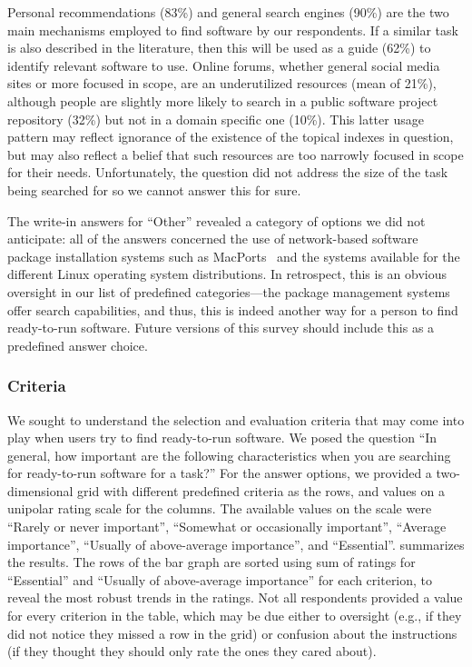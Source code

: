 \documentclass{casicswhitepaper}
\begin{document}
Personal recommendations (83\%) and general search engines (90\%) are the two main mechanisms employed to find software by our respondents. If a similar task is also described in the literature, then this will be used as a guide (62\%) to identify relevant software to use. Online forums, whether general social media sites or more focused in scope, are an underutilized resources (mean of 21\%), although people are slightly more likely to search in a public software project repository (32\%) but not in a domain specific one (10\%). This latter usage pattern may reflect ignorance of the existence of the topical indexes in question, but may also reflect a belief that such resources are too narrowly focused in scope for their needs. Unfortunately, the question did not address the size of the task being searched for so we cannot answer this for sure.

The write-in answers for ``Other'' revealed a category of options we did not anticipate: all of the answers concerned the use of network-based software package installation systems such as MacPorts~\cite{fuller2002macports} and the systems available for the different Linux operating system distributions.  In retrospect, this is an obvious oversight in our list of predefined categories---the package management systems offer search capabilities, and thus, this is indeed another way for a person to find ready-to-run software.  Future versions of this survey should include this as a predefined answer choice.


\subsubsection{Criteria}
\label{criteria-ready-to-use}

We sought to understand the selection and evaluation criteria that may come into play when users try to find ready-to-run software.  We posed the question ``In general, how important are the following characteristics when you are searching for ready-to-run software for a task?''  For the answer options, we provided a two-dimensional grid with different predefined criteria as the rows, and values on a unipolar rating scale for the columns.  The available values on the scale were ``Rarely or never important'', ``Somewhat or occasionally important'', ``Average importance'', ``Usually of above-average importance'', and ``Essential''.  summarizes the results.  The rows of the bar graph are sorted using sum of ratings for ``Essential'' and ``Usually of above-average importance'' for each criterion, to reveal the most robust trends in the ratings.  Not all respondents provided a value for every criterion in the table, which may be due either to oversight (e.g., if they did not notice they missed a row in the grid) or confusion about the instructions (if they thought they should only rate the ones they cared about).
\end{document}
